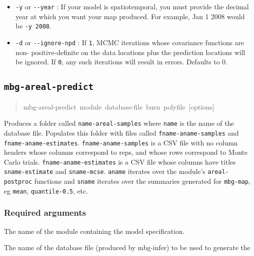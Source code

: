 \begin{itemize}
\item \texttt{-y} or \texttt{-{}-year} : If your model is spatiotemporal, you must provide the decimal year at
which you want your map produced. For example, Jan 1 2008 would be \texttt{-y 2008}.

\item \texttt{-d} or \texttt{-{}-ignore-npd} : If \texttt{1}, MCMC iterations whose covariance functions are non-
positive-definite on the data locations plus the prediction locations will be ignored. If
\texttt{0}, any such iterations will result in errors. Defaults to 0.

\end{itemize}




\subsection{\texttt{mbg-areal-predict}%
}
%
\begin{quote}{\ttfamily \raggedright \noindent
mbg-areal-predict~module~database-file~burn~polyfile~{[}options{]}
}
\end{quote}

Produces a folder called \texttt{name-areal-samples} where \texttt{name} is the name of the
database file. Populates this folder with files called \texttt{fname-aname-samples} and
\texttt{fname-aname-estimates}. \texttt{fname-aname-samples} is a CSV file with no column
headers whose columns correspond to reps, and whose rows correspond to Monte Carlo
trials. \texttt{fname-aname-estimates} is a CSV file whose columns have titles
\texttt{sname-estimate} and \texttt{sname-mcse}. \texttt{aname} iterates over the module's
\texttt{areal-postproc} functions and \texttt{sname} iterates over the summaries generated for
\texttt{mbg-map}, eg \texttt{mean}, \texttt{quantile-0.5}, etc.




\subsubsection{Required arguments%
}
\setcounter{listcnt0}{0}
\begin{list}{.}
{
\setlength{\rightmargin}{\leftmargin}
}

\item The name of the module containing the model specification.

\item The name of the database file (produced by mbg-infer) to be used to generate the
\end{list}

